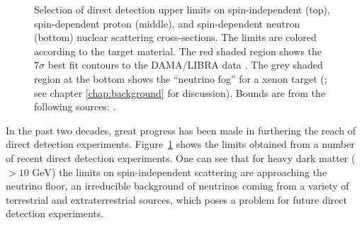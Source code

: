 \documentclass[b5paper, 10pt, twoside]{book}
\newcommand{\annotatestyle}{\sbsfstyle}
\newcommand{\plotlineannotation}[1]{{\scriptsize\annotatestyle #1}}
\newcommand{\naifillcolor}{scp-red-light-1}
\newcommand{\naicolor}{scp-red-dark-1}
\newcommand{\cawocolor}{scp-purple-dark-1}
\newcommand{\xenoncolor}{scp-orange-dark-1}
\newcommand{\gecolor}{scp-blue-dark-1}
\newcommand{\nufogcolor}{scp-grey-light-2}
\begin{document}
\begin{figure}
\vspace{-0.5pc}
\caption{Selection of direct detection upper limits on spin-independent (top), spin-dependent proton (middle), and spin-dependent neutron (bottom) nuclear scattering cross-sections. The limits are colored according to the target material. The red shaded region shows the $7\sigma$ best fit contours to the DAMA/LIBRA data \parencite{SavageEtAl2009}. The grey shaded region at the bottom shows the ``neutrino fog'' for a xenon target (\textcite{OHare2021}; see chapter \ref{chap:background} for discussion). Bounds are from the following sources: \textcites{DarkSide2023, XENONnT2023, CDEX2019, PandaX2021, DAMIC2020, LZ2024, CRESSTIII2019, COSINE1002018, CDMSlite2018, COSINE1002021, PICO602019, XENON2019a}.}
\label{fig:dd-reach}
\end{figure}

In the past two decades, great progress has been made in furthering the reach of direct detection experiments. Figure~\ref{fig:dd-reach} shows the limits obtained from a number of recent direct detection experiments. One can see that for heavy dark matter ($> 10\text{ GeV}$) the limits on spin-independent scattering are approaching the neutrino floor, an irreducible background of neutrinos coming from a variety of terrestrial and extraterrestrial sources, which poses a problem for future direct detection experiments.
\end{document}
